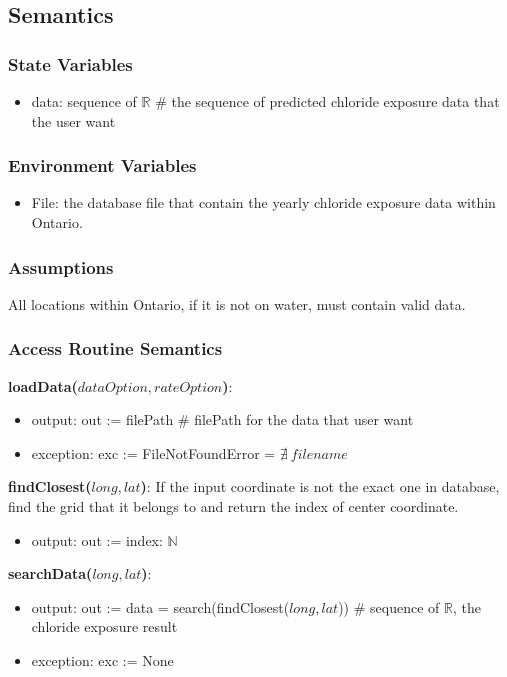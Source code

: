 \documentclass[12pt, titlepage]{article}
\begin{document}
\subsection{Semantics}

\subsubsection{State Variables}
\begin{itemize}
\item data: sequence of $\mathbb{R}$ \# the sequence of predicted chloride exposure data that the user want

\end{itemize}

\subsubsection{Environment Variables}
\begin{itemize}
\item File: the database file that contain the yearly chloride exposure data within Ontario.
\end{itemize}

\subsubsection{Assumptions}
All locations within Ontario, if it is not on water, must contain valid data. 

\subsubsection{Access Routine Semantics}
\noindent \textbf{loadData($dataOption, rateOption$)}:
\begin{itemize}
\item output: out := filePath \# filePath for the data that user want
\item exception: exc := FileNotFoundError = $\nexists ~ filename$
\end{itemize}
\noindent \textbf{findClosest($long, lat$)}: If the input coordinate is not the exact one in database, find the grid that it belongs to and return the index of center coordinate.
\begin{itemize}
\item output: out := index: $\mathbb{N}$
\end{itemize}
\noindent \textbf{searchData($long, lat$)}:
\begin{itemize}
\item output: out := data = search(findClosest($long, lat$)) \# sequence of $\mathbb{R}$, the chloride exposure result
\item exception: exc := None
\end{itemize}
\end{document}
